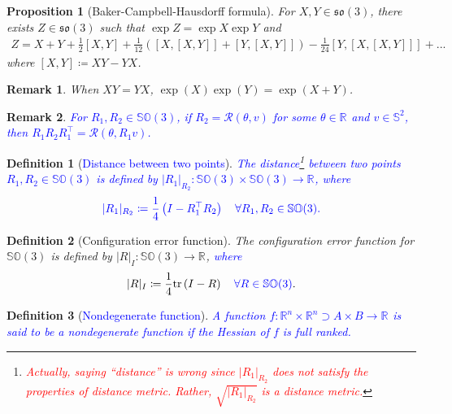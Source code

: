 \documentclass{article}
\newcommand{\SOthree}{\mathbb{SO}(3)}
\newcommand{\sothree}{\mathfrak{so}(3)}
\newcommand{\R}[1]{\mathbb{R}^{#1}}
\newtheorem{remark}{Remark}
\newtheorem{definition}{Definition}
\newtheorem{proposition}{Proposition}
\newcommand{\trace}[1]{\text{tr}\left(#1\right)}
\newcommand{\brackets}[1]{\left(#1\right)}
\newcommand{\textblue}[1]{\textcolor{blue}{#1}}
\newcommand{\normSOthree}[1]{{{\vert}#1 {\vert}_I}}
\begin{document}
\begin{proposition}[Baker-Campbell-Hausdorff formula]
For $X,Y\in \sothree$, there exists $ Z\in\sothree$ such that $\exp{Z} = \exp{X}\exp{Y}$ and 
\begin{align*}
    Z = X + Y + \frac{1}{2}[X, Y] + \frac{1}{12}\brackets{[X,[X,Y]] + [Y, [X,Y]]} - \frac{1}{24}[Y,[X,[X,Y]]] + ...
\end{align*}
where $[X,Y]\coloneqq XY - YX$. 
\end{proposition}

\begin{remark} \label{remark:baker-campbell-hausdorff}
When $XY = YX$, $\exp(X)\exp{(Y)} = \exp{(X+Y)}$. 
\end{remark}

\begin{remark}\label{remark:axis}
    \textblue{For $R_1, R_2\in\SOthree$, if $R_2 = \mathcal{R}(\theta, v)$ for some $\theta\in\R{}$ and $v\in\mathbb{S}^2$, then $R_1R_2R_1^\top = \mathcal{R}(\theta, R_1 v)$. }
\end{remark}

\begin{definition}[\textblue{Distance between two points}]
    \textblue{The distance\footnote{\textcolor{red}{Actually, saying ``distance'' is wrong since $|R_1|_{R_2}$ does not satisfy the properties of distance metric. Rather, $\sqrt{|R_1|_{R_2}}$ is a distance metric.}} between two points $R_1, R_2\in\SOthree$  is defined by $|R_1|_{R_2}:\SOthree\times\SOthree\to\R{}$, where }
    \begin{align*}
        \textblue{|R_1|_{R_2} \coloneqq \frac{1}{4}\brackets{I - R_1^\top R_2} \quad \forall R_1, R_2 \in \SOthree.}
    \end{align*}
\end{definition}

\begin{definition}[Configuration error function]\label{def:config_err}
    The configuration error function for $\SOthree$ is defined by $\normSOthree{{R}}: \SOthree \to \R{}$, \textblue{where} \[\normSOthree{{R}} \coloneqq \frac{1}{4}\trace{I - {R}} \quad \textblue{\forall R\in\SOthree}.\]
\end{definition}

\begin{definition}[\textblue{Nondegenerate function}]\label{def:nondegenerate_function}
\textblue{A function $f: \R{n}\times \R{n} \supset A\times B \to \R{}$ is said to be a nondegenerate function if the Hessian of $f$ is full ranked.}
\end{definition}
\end{document}
